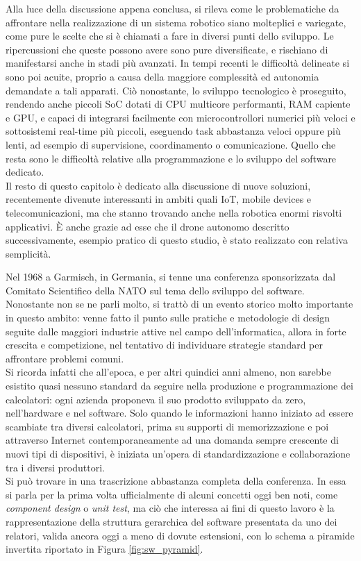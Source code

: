 \indent Alla luce della discussione appena conclusa, si rileva come le problematiche da affrontare nella realizzazione di un sistema robotico siano molteplici e variegate, come pure le scelte che si è chiamati a fare in diversi punti dello sviluppo. Le ripercussioni che queste possono avere sono pure diversificate, e rischiano di manifestarsi anche in stadi più avanzati. In tempi recenti le difficoltà delineate si sono poi acuite, proprio a causa della maggiore complessità ed autonomia demandate a tali apparati. Ciò nonostante, lo sviluppo tecnologico è proseguito, rendendo anche piccoli SoC dotati di CPU multicore performanti, RAM capiente e GPU, e capaci di integrarsi facilmente con microcontrollori numerici più veloci e sottosistemi real-time più piccoli, eseguendo task abbastanza veloci oppure più lenti, ad esempio di supervisione, coordinamento o comunicazione. Quello che resta sono le difficoltà relative alla programmazione e lo sviluppo del software dedicato.\\
Il resto di questo capitolo è dedicato alla discussione di nuove soluzioni, recentemente divenute interessanti in ambiti quali IoT, mobile devices e telecomunicazioni, ma che stanno trovando anche nella robotica enormi risvolti applicativi. È anche grazie ad esse che il drone autonomo descritto successivamente, esempio pratico di questo studio, è stato realizzato con relativa semplicità.

\indent Nel 1968 a Garmisch, in Germania, si tenne una conferenza sponsorizzata dal Comitato Scientifico della NATO sul tema dello sviluppo del software. Nonostante non se ne parli molto, si trattò di un evento storico molto importante in questo ambito: venne fatto il punto sulle pratiche e metodologie di design seguite dalle maggiori industrie attive nel campo dell'informatica, allora in forte crescita e competizione, nel tentativo di individuare strategie standard per affrontare problemi comuni.\\
Si ricorda infatti che all'epoca, e per altri quindici anni almeno, non sarebbe esistito quasi nessuno standard da seguire nella produzione e programmazione dei calcolatori: ogni azienda proponeva il suo prodotto sviluppato da zero, nell'hardware e nel software. Solo quando le informazioni hanno iniziato ad essere scambiate tra diversi calcolatori, prima su supporti di memorizzazione e poi attraverso Internet contemporaneamente ad una domanda sempre crescente di nuovi tipi di dispositivi, è iniziata un'opera di standardizzazione e collaborazione tra i diversi produttori.\\
Si può trovare in \cite{middleware} una trascrizione abbastanza completa della conferenza. In essa si parla per la prima volta ufficialmente di alcuni concetti oggi ben noti, come \emph{component design} o \emph{unit test}, ma ciò che interessa ai fini di questo lavoro è la rappresentazione della struttura gerarchica del software presentata da uno dei relatori, valida ancora oggi a meno di dovute estensioni, con lo schema a piramide invertita riportato in Figura \ref{fig:sw_pyramid}.

